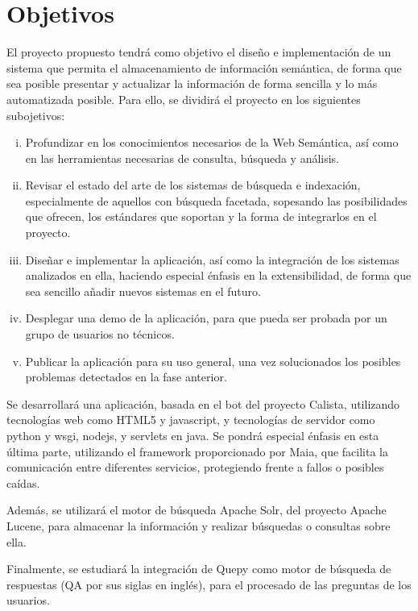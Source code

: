 \documentclass[a4paper,11pt]{report}
\begin{document}
\chapter*{Objetivos}

El proyecto propuesto tendrá como objetivo el diseño e implementación de un sistema que permita el almacenamiento de información semántica, de forma que sea posible presentar y actualizar la información de forma sencilla y lo más automatizada posible.
Para ello, se dividirá el proyecto en los siguientes subojetivos:

\begin{enumerate}[i.]
  \item Profundizar en los conocimientos necesarios de la Web Semántica, así como en las herramientas necesarias de consulta, búsqueda y análisis.
  \item Revisar el estado del arte de los sistemas de búsqueda e indexación, especialmente de aquellos con búsqueda facetada, sopesando las posibilidades que ofrecen, los estándares que soportan y la forma de integrarlos en el proyecto.
  \item Diseñar e implementar la aplicación, así como la integración de los sistemas analizados en ella, haciendo especial énfasis en la extensibilidad, de forma que sea sencillo añadir nuevos sistemas en el futuro.
  \item Desplegar una demo de la aplicación, para que pueda ser probada por un grupo de usuarios no técnicos.
  \item Publicar la aplicación para su uso general, una vez solucionados los posibles problemas detectados en la fase anterior.

\end{enumerate}


Se desarrollará una aplicación, basada en el bot del proyecto Calista, utilizando tecnologías web como HTML5 y javascript, y tecnologías de servidor como python y wsgi, nodejs, y servlets en java. Se pondrá especial énfasis en esta última parte, utilizando el framework proporcionado por Maia, que facilita la comunicación entre diferentes servicios, protegiendo frente a fallos o posibles caídas.

Además, se utilizará el motor de búsqueda Apache Solr, del proyecto Apache Lucene, para almacenar la información y realizar búsquedas o consultas sobre ella.

Finalmente, se estudiará la integración de Quepy como motor de búsqueda de respuestas (QA por sus siglas en inglés), para el procesado de las preguntas de los usuarios.
\end{document}
